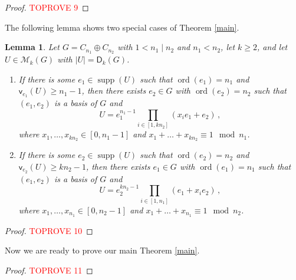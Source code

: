 \documentclass[11pt]{amsart}
\newtheorem{lemma}[theorem]{Lemma}
\theoremstyle{definition}
\DeclareMathOperator{\ord}{ord}
\DeclareMathOperator{\supp}{supp}
\newcommand{\vp}{\mathsf v}
\numberwithin{equation}{section}
\begin{document}
\begin{proof}\textcolor{red}{TOPROVE 9}\end{proof}




The following lemma shows two special cases of Theorem \ref{main}.

\begin{lemma}\label{sch-I}
	Let  $G = C_{n_1} \oplus C_{n_2}$  with $1 < n_1 \mid n_2$ and $n_1<n_2$, let $k\ge 2$, and let  $U \in \mathcal M_k(G)$ with  $|U|=\mathsf D_k (G)$. 
	\begin{enumerate}
		\item[1.] If there is some $e_1\in \supp(U)$ such that $\ord(e_1)=n_1$ and $\vp_{e_1}(U)\geq n_1-1$, then 
		there exists $e_2\in G$ with  $\ord(e_2)=n_2$ such that  $(e_1,e_2)$ is a basis of $G$ and
		\[U = e_1^{n_1-1}  \prod_{i\in [1,kn_2]} (x_{i}e_1+e_2)\,,
		\]
		where $x_1, \ldots, x_{kn_2}  \in [0, n_1-1]$ and $x_1 + \ldots + x_{kn_2} \equiv 1 \mod n_1$.
		
		\item[2.] If there is some $e_2\in \supp(U)$ such that  $\ord(e_2)=n_2$ and $\vp_{e_2}(U)\geq kn_2-1$, then 
		there exists $e_1\in G$ with $\ord(e_1)=n_1$  such that $(e_1,e_2)$ is a basis of $G$ and
		\[U = e_2^{kn_2-1}  \prod_{i\in [1,n_1]} (e_1+x_{i}e_2)\,,
		\]
		where $x_1, \ldots, x_{n_1}  \in [0, n_2-1]$ and $x_1 + \ldots + x_{n_1} \equiv 1 \mod n_2$.
	\end{enumerate}
\end{lemma}

\begin{proof}\textcolor{red}{TOPROVE 10}\end{proof}



\bigskip
Now we are ready to prove our main Theorem \ref{main}.

\begin{proof}\textcolor{red}{TOPROVE 11}\end{proof}
\end{document}
